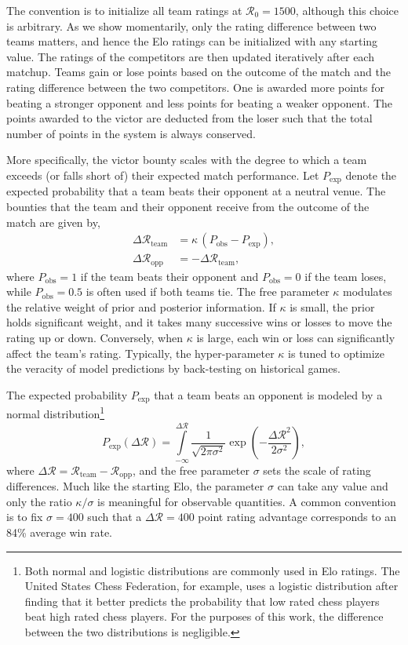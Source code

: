 \documentclass[aps,prc,reprint,amsmath,superscriptaddress,nofootinbib]{revtex4-1}
\newcommand{\R}{\mathcal{R}}
\begin{document}
The convention is to initialize all team ratings at ${\R_0 = 1500}$, although this choice is arbitrary.
As we show momentarily, only the rating difference between two teams matters, and hence the Elo ratings can be initialized with any starting value.
The ratings of the competitors are then updated iteratively after each matchup.
Teams gain or lose points based on the outcome of the match and the rating difference between the two competitors.
One is awarded more points for beating a stronger opponent and less points for beating a weaker opponent.
The points awarded to the victor are deducted from the loser such that the total number of points in the system is always conserved.

More specifically, the victor bounty scales with the degree to which a team exceeds (or falls short of) their expected match performance.
Let $P_\text{exp}$ denote the expected probability that a team beats their opponent at a neutral venue.
The bounties that the team and their opponent receive from the outcome of the match are given by,
\begin{align}
  \label{elo}
  \Delta \R_\text{team} &= \kappa \,(P_\text{obs} - P_\text{exp}),\\
  \Delta \R_\text{opp} &= -\Delta \R_\text{team},
\end{align}
where ${P_\text{obs}=1}$ if the team beats their opponent and ${P_\text{obs}=0}$ if the team loses, while $P_\text{obs}=0.5$ is often used if both teams tie.
The free parameter $\kappa$ modulates the relative weight of prior and posterior information. 
If $\kappa$ is small, the prior holds significant weight, and it takes many successive wins or losses to move the rating up or down.
Conversely, when $\kappa$ is large, each win or loss can significantly affect the team's rating.
Typically, the hyper-parameter $\kappa$ is tuned to optimize the veracity of model predictions by back-testing on historical games.

The expected probability $P_\text{exp}$ that a team beats an opponent is modeled by a normal distribution\footnote{Both normal and logistic distributions are commonly used in Elo ratings. The United States Chess Federation, for example, uses a logistic distribution after finding that it better predicts the probability that low rated chess players beat high rated chess players. For the purposes of this work, the difference between the two distributions is negligible.} 
\begin{equation}
  \label{win_prob}
  P_\text{exp}(\Delta \R) = \int\limits_{-\infty}^{\Delta \R} \frac{1}{\sqrt{2\pi \sigma^2}} \exp \left( -\frac{{\Delta\R}^2}{2 \sigma^2}\right),
\end{equation}
where $\Delta \R = \R_\text{team} - \R_\text{opp}$, and the free parameter $\sigma$ sets the scale of rating differences.
Much like the starting Elo, the parameter $\sigma$ can take any value and only the ratio $\kappa/\sigma$ is meaningful for observable quantities.
A common convention is to fix $\sigma=400$ such that a $\Delta \R=400$ point rating advantage corresponds to an 84\% average win rate.
\end{document}
